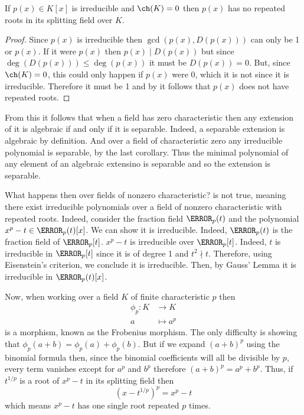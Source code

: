 \documentclass[12pt,oneside]{book}
\begin{document}
\begin{corollary}\label{cor:irreducible is separable in characteristic 0}
	If \( p(x) \in K[x] \) is irreducible and \( \ch(K) = 0 \) then \( p(x) \) has  no
	repeated roots in its splitting field over \( K \).
\end{corollary}
\begin{proof}
	Since \( p(x) \) is irreducible then \( \gcd(p(x), D(p(x))) \) can only be 1 or \( p(x)
	\). If it were \( p(x) \) then \( p(x) \mid D(p(x)) \) but since \( \deg(D(p(x))) \leq
	\deg(p(x)) \) it must be \( D(p(x)) = 0 \). But, since \( \ch(K) = 0 \), this could only
	happen if \( p(x) \) were 0, which it is not since it is irreducible. Therefore it must
	be 1 and by  it follows that \( p(x) \) does not have repeated roots.
\end{proof}

From this it follows that when a field has zero characteristic then any extension of it is
algebraic if and only if it is separable. Indeed, a separable extension is algebraic by
definition. And over a field of characteristic zero any irreducible polynomial is
separable, by the last corollary. Thus the minimal polynomial of any element of an
algebraic extensino is separable and so the extension is separable. 

What happens then over fields of nonzero characteristic?  is not true, meaning there exist
irreducible polynomials over a field of nonzero characteristic with repeated roots.
Indeed, consider the fraction field \( \F_p(t) \) and the polynomial \( x^p - t \in
\F_p(t)[x] \). We can show it is irreducible. Indeed, \( \F_p(t) \) is the fraction field
of \( \F_p[t] \). \( x^p - t \) is irreducible over \( \F_p[t] \). Indeed, \( t \) is
irreducible in \( \F_p[t] \) since it is of degree 1 and \( t^2 \nmid t \). Therefore,
using Eisenstein's criterion, we conclude it is irreducible. Then, by Gauss' Lemma it is
irreducible in \( \F_p(t)[x] \).

Now, when working over a field \( K \) of finite characteristic \( p \) then
\begin{align*}
	\phi_p \colon K & \to K \\
	a & \mapsto a^p
\end{align*}
is a morphism, known as the Frobenius morphism. The only difficulty is showing that \(
\phi_p(a+b) = \phi_p(a) + \phi_p(b) \). But if we expand \( (a + b)^p \) using the
binomial formula then, since the binomial coefficients will all be divisible by \( p \),
every term vanishes except for \( a^p \) and \( b^p \) therefore \( (a + b)^p = a^p + b^p
\). Thus, if \( t^{1/p} \) is a root of \( x^p - t \) in its splitting field then
\begin{equation*}
	(x - t^{1/p})^p = x^p - t
\end{equation*}
which means \( x^p - t \) has one single root repeated \( p \) times.
\end{document}
